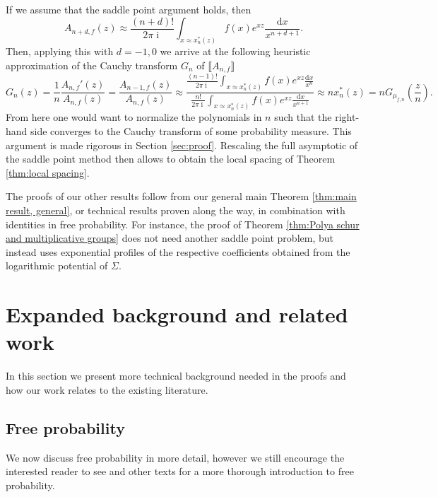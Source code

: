 \documentclass[reqno]{amsart}
\newcommand{\1}{\mathbf{1}}
\newcommand{\dd}{\mathrm{d}}
\DeclareMathOperator{\ii}{i}
\theoremstyle{plain}
\theoremstyle{definition}
\theoremstyle{remark}
\numberwithin{equation}{section}
\begin{document}
  If we assume that the saddle point argument holds, then \begin{equation*}
 A_{n+d,f}(z)\approx\frac{(n+d)!}{2\pi\ii}\int_{x\approx x_{n}^*(z)}  f(x)e^{xz}\frac{\dd x}{x^{n+d+1}}. 
 \end{equation*}
  Then, applying this with $d=-1,0$ we arrive at the following heuristic approximation of the Cauchy transform $G_n$ of $\llbracket A_{n,f}\rrbracket$\begin{equation*}
 G_{n}(z)=\frac{1}{n}\frac{A_{n,f}'(z)}{A_{n,f}(z)}=\frac{A_{n-1,f}(z)}{A_{n,f}(z)}\approx \frac{\frac{(n-1)!}{2\pi\ii}\int_{x\approx x_{n}^*(z)}  f(x)e^{xz}\frac{\dd x}{x^{n}}}{\frac{n!}{2\pi\ii}\int_{x\approx x_{n}^*(z)}  f(x)e^{xz}\frac{\dd x}{x^{n+1}}} \approx n x_{n}^*(z)=nG_{\mu_{f,n}}\left(\frac{z}{n}\right). 
 \end{equation*} From here one would want to normalize the polynomials in $n$ such that the right-hand side converges to the Cauchy transform of some probability measure. This argument is made rigorous in Section \ref{sec:proof}. 
  Rescaling the full asymptotic of the saddle point method then allows to obtain the local spacing of Theorem \ref{thm:local spacing}.
 
 The proofs of our other results follow from our general main Theorem \ref{thm:main result, general}, or technical results proven along the way, in combination with identities in free probability.  For instance, the proof of Theorem \ref{thm:Polya schur and multiplicative groups} does not need another saddle point problem, but instead uses exponential profiles of the respective coefficients obtained from the logarithmic potential of $\Sigma$.


\section{Expanded background and related work}\label{sec:Background}  In this section we present more technical background needed in the proofs and how our work relates to the existing literature. 


\subsection{Free probability}  We now discuss free probability in more detail, however we still encourage the interested reader to see \cite{Mingo-Speicher2017,Nica-Speicher2006} and other texts for a more thorough introduction to free probability. 
\end{document}
